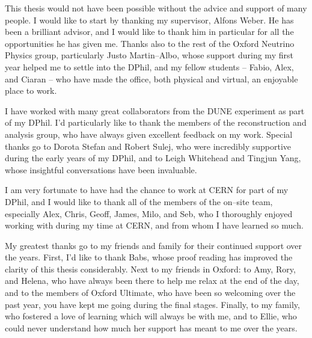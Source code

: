 This thesis would not have been possible without the advice and support of many
people. I would like to start by thanking my supervisor, Alfons Weber. He has
been a brilliant advisor, and I would like to thank him in particular for all
the opportunities he has given me. Thanks also to the rest of the Oxford
Neutrino Physics group, particularly Justo Martin--Albo, whose support during 
my first year helped me to settle into the DPhil, and my fellow students -- 
Fabio, Alex, and Ciaran -- who have made the office, both physical and 
virtual, an enjoyable place to work.

\medskip\noindent
I have worked with many great collaborators from the DUNE experiment
as part of my DPhil. I'd particularly like to thank the members of the 
\protodune{} reconstruction and analysis group, who have always given 
excellent feedback on my work. Special thanks go to Dorota Stefan and Robert 
Sulej, who were incredibly supportive during the early years of my DPhil, and 
to Leigh Whitehead and Tingjun Yang, whose insightful conversations have been 
invaluable. 

\medskip\noindent
I am very fortunate to have had the chance to work at CERN for part of my DPhil,
and I would like to thank all of the members of the on--site \protodune{} 
team, especially Alex, Chris, Geoff, James, Milo, and Seb, who I thoroughly 
enjoyed working with during my time at CERN, and from whom I have learned so 
much. 

\medskip\noindent
My greatest thanks go to my friends and family for their continued support 
over the years. First, I'd like to thank Babs, whose proof reading has improved 
the clarity of this thesis considerably. Next to my friends in Oxford: to Amy, 
Rory, and Helena, who have always been there to help me relax at the end of the 
day, and to the members of Oxford Ultimate, who have been so welcoming over the 
past year, you have kept me going during the final stages.  Finally, to my 
family, who fostered a love of learning which will always be with me, and to 
Ellie, who could never understand how much her support has meant to me over the 
years.
